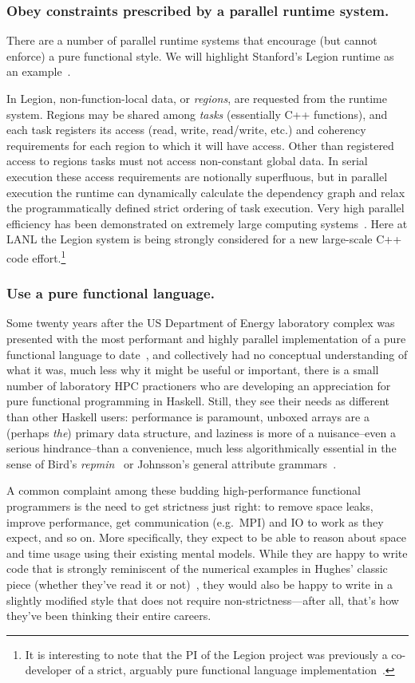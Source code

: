 \documentclass{llncs}
\begin{document}
\subsubsection{Obey constraints prescribed by a parallel runtime system.}
There are a number of parallel runtime systems that encourage (but cannot
enforce) a pure functional style.  We will highlight Stanford's Legion
runtime as an example~\cite{Bauer12}.

In Legion, non-function-local data, or \emph{regions}, are requested from the
runtime system.  Regions may be shared among \emph{tasks} (essentially C++
functions), and each task registers its access (read, write, read/write, etc.)
and coherency requirements for each region to which it will have access.
Other than registered access to regions tasks must not access non-constant
global data.  In serial execution these access requirements are notionally
superfluous, but in parallel execution the runtime can dynamically calculate
the dependency graph and relax the programmatically defined strict ordering of
task execution.  Very high parallel efficiency has been demonstrated on extremely
large computing systems~\cite{Bauer14}.  Here at LANL the Legion system is
being strongly considered for a new large-scale C++ code effort.\footnote{
It is interesting to note that the PI of the Legion project was previously a
co-developer of a strict, arguably pure functional language
implementation~\cite{AikenFL}.}

\subsubsection{Use a pure functional language.}
Some twenty years after the US Department of Energy laboratory complex was
presented with the most performant and highly parallel implementation of a
pure functional language to date~\cite{Davis96}, and collectively had no
conceptual understanding of what it was, much less why it might be useful or
important, there is a small number of laboratory HPC practioners who are
developing an appreciation for pure functional programming in Haskell.  Still,
they see their needs as different than other Haskell users: performance is
paramount, unboxed arrays are a (perhaps \emph{the}) primary data structure,
and laziness is more of a nuisance--even a serious hindrance--than a
convenience, much less algorithmically essential in the sense of Bird's
\emph{repmin}~\cite{Bird84} or Johnsson's general attribute
grammars~\cite{Johnsson87}.

A common complaint among these budding high-performance functional programmers
is the need to get strictness just right: to remove space leaks,
improve performance, get communication (e.g.\ MPI) and IO to work as they
expect, and so on.  More specifically, they expect to be able to reason about
space and time usage using their existing mental models. While they are
happy to write code that is strongly reminiscent of the numerical examples in
Hughes' classic piece (whether they've read it or not)~\cite{Hughes89},
they would also be happy to write in a slightly modified style that does
not require non-strictness---after all, that's how they've been thinking their
entire careers.
\end{document}
